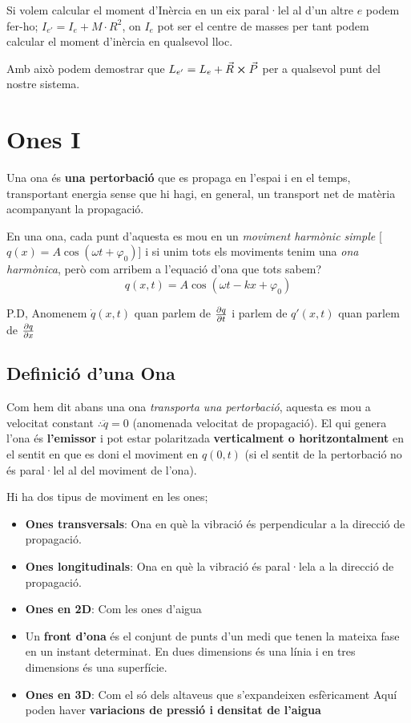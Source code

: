 \documentclass[12pt]{article}
\begin{document}
Si volem calcular el moment d'Inèrcia en un eix paral·lel al d'un altre $e$ podem fer-ho; $I_{e'} = I_e + M\cdot R^2$, on $I_e$ pot ser el centre de masses per tant podem calcular el moment d'inèrcia en qualsevol lloc.

Amb això podem demostrar que $L_{e'} = L_e + \vec{R} \cross \vec{P}$ per a qualsevol punt del nostre sistema.

\section{Ones I}

Una ona és \textbf{una pertorbació} que es propaga en l’espai i en el temps, transportant energia sense que hi hagi, en general, un transport net de matèria acompanyant la propagació.

En una ona, cada punt d'aquesta es mou en un \textit{moviment harmònic simple} [$q(x) = A\cos(\omega t + \varphi_0)$] i si unim tots els moviments tenim una \textit{ona harmònica}, però com arribem a l'equació d'ona que tots sabem?
\[\boxed{q(x,t) = A\cos(\omega t - kx + \varphi_0)}\]

P.D, Anomenem $\dot{q}(x,t)$ quan parlem de $\pdv{q}{t}$ i parlem de $q'(x,t)$ quan parlem de $\pdv{q}{x}$

\subsection{Definició d'una Ona}

Com hem dit abans una ona \textit{transporta una pertorbació}, aquesta es mou a velocitat constant $\therefore \ddot{q} = 0$ (anomenada velocitat de propagació). El qui genera l'ona és \textbf{l'emissor} i pot estar polaritzada \textbf{verticalment o horitzontalment} en el sentit en que es doni el moviment en $q(0,t)$ (si el sentit de la pertorbació no és paral·lel al del moviment de l'ona).

Hi ha dos tipus de moviment en les ones;

\begin{itemize}
    \item \textbf{Ones transversals}: Ona en què la vibració és perpendicular a la direcció de propagació.
    \item \textbf{Ones longitudinals}: Ona en què la vibració és paral·lela a la direcció de propagació.
    \item \textbf{Ones en 2D}: Com les ones d'aigua
    \item Un \textbf{front d’ona} és el conjunt de punts d’un medi que tenen la mateixa fase en un instant determinat. En dues dimensions és una línia i en tres dimensions és una superfície.
    \item \textbf{Ones en 3D}: Com el só dels altaveus que s'expandeixen esfèricament
    Aquí poden haver \textbf{variacions de pressió i densitat de l'aigua}
\end{itemize}
\end{document}
